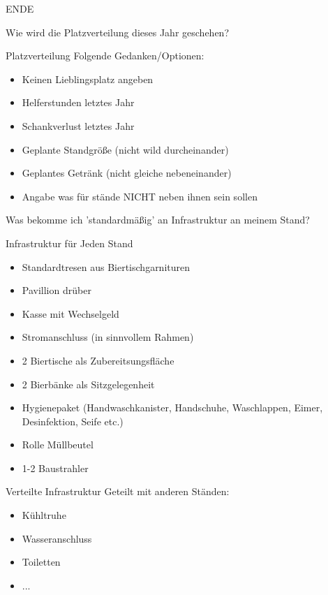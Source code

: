 \appendix
\backupbegin

\begin{frame}[standout]
    \Huge
    ENDE
\end{frame}

\begin{frame}[standout]
    Wie wird die Platzverteilung dieses Jahr geschehen?
\end{frame}

\begin{frame}[c]{Platzverteilung}
    Folgende Gedanken/Optionen:
    \begin{itemize}[<+(1)->]
        \item Keinen Lieblingsplatz angeben
        \item Helferstunden letztes Jahr
        \item Schankverlust letztes Jahr
        \item Geplante Standgröße (nicht wild durcheinander)
        \item Geplantes Getränk (nicht gleiche nebeneinander)
        \item Angabe was für stände NICHT neben ihnen sein sollen
    \end{itemize}
\end{frame}

\begin{frame}[standout]
    Was bekomme ich 'standardmäßig' an Infrastruktur an meinem Stand?
\end{frame}

\begin{frame}[c]{Infrastruktur für Jeden Stand}
    \begin{itemize}[<+(1)->]
        \item Standardtresen aus Biertischgarnituren
        \item Pavillion drüber
        \item Kasse mit Wechselgeld
        \item Stromanschluss (in sinnvollem Rahmen)
        \item 2 Biertische als Zubereitsungsfläche
        \item 2 Bierbänke als Sitzgelegenheit
        \item Hygienepaket (Handwaschkanister, Handschuhe, Waschlappen, Eimer, Desinfektion, Seife etc.)
        \item Rolle Müllbeutel
        \item 1-2 Baustrahler
    \end{itemize}
\end{frame}


\begin{frame}[c]{Verteilte Infrastruktur}
    Geteilt mit anderen Ständen:
    \begin{itemize}[<+(1)->]
        \item Kühltruhe
        \item Wasseranschluss
        \item Toiletten
        \item ...
    \end{itemize}

\end{frame}


\backupend

